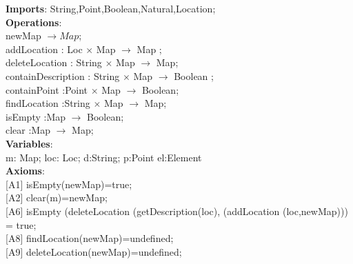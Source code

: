 \documentclass[12pt]{article}
\begin{document}
\begin{spacing}{1.5}
\noindent \textbf{Imports}: String,Point,Boolean,Natural,Location;\\
\noindent \textbf{Operations}:\\
\hspace*{5mm} newMap $\rightarrow Map$;\\
\hspace*{5mm} addLocation : Loc $\times$  Map $\rightarrow$ Map ;\\
\hspace*{5mm} deleteLocation : String $\times$ Map $\rightarrow$ Map;\\
\hspace*{5mm} containDescription : String $\times$  Map $\rightarrow$ Boolean ;\\
\hspace*{5mm} containPoint :Point $\times$ Map $\rightarrow$ Boolean;\\
\hspace*{5mm} findLocation :String $\times $ Map $\rightarrow$ Map;\\
\hspace*{5mm} isEmpty :Map $\rightarrow$ Boolean;\\
\hspace*{5mm} clear :Map $\rightarrow$ Map;\\

\noindent \textbf{Variables}:\\
\hspace*{5mm} m: Map; loc: Loc; d:String; p:Point el:Element\\
\noindent \textbf{Axioms}:\\
\hspace*{5mm} [A1] isEmpty(newMap)=true;\\
\hspace*{5mm} [A2] clear(m)=newMap;\\
\hspace*{5mm} [A6] isEmpty (deleteLocation (getDescription(loc), (addLocation (loc,newMap))) = true;\\
\hspace*{5mm} [A8] findLocation(newMap)=undefined;\\
\hspace*{5mm} [A9] deleteLocation(newMap)=undefined;\\

\end{spacing}
\end{document}

